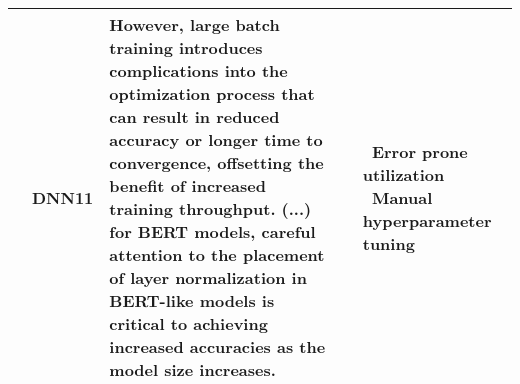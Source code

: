 {\begin{longtable}{|l|c|p{11.8cm}|p{0.6cm}|p{2cm}|}
         & DNN11 & However, large batch training introduces complications into the optimization process that can result in reduced accuracy or longer time to convergence, offsetting the benefit of increased training throughput. (...) for BERT models, careful attention to the placement of layer normalization in BERT-like models is critical to achieving increased accuracies as the model size increases.
         & \cite{shoeybi_megatron-lm_2020,li_pytorch_2020}
	     & \textbullet\ Error prone utilization \newline \textbullet\ Manual hyperparameter tuning \\  \cline{2-5}
         
         
	\bottomrule
\end{longtable}
}
\clearpage
\twocolumn
